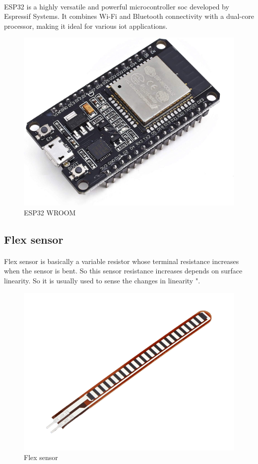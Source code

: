 \paragraph{}
ESP32 is a highly versatile and powerful microcontroller \ac{soc} developed by Espressif Systems. It combines Wi-Fi and Bluetooth connectivity with a dual-core processor, making it ideal for various \ac{iot} applications.
\begin{figure}[h]
	\centering
	\includegraphics[width=0.6\linewidth]{images/esp32}
	\caption{ESP32 WROOM}
	\label{fig:esp32}
\end{figure}
\subsection{Flex sensor}
\paragraph{}
Flex sensor is basically a variable resistor whose terminal resistance increases when the sensor is bent. So this sensor resistance increases depends on surface linearity. So it is usually used to sense the changes in linearity "\cite{flex}.
\begin{figure}[h]
	\centering
	\includegraphics[width=0.6\linewidth]{images/flex-sensor}
	\caption{Flex sensor}
	\label{fig:flex-sensor}
\end{figure}
